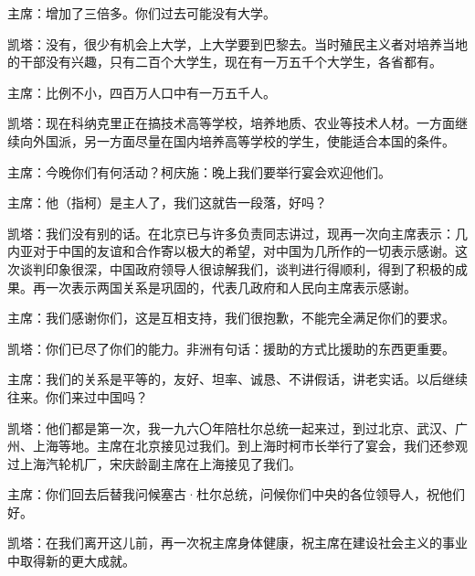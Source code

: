 主席：增加了三倍多。你们过去可能没有大学。

凯塔：没有，很少有机会上大学，上大学要到巴黎去。当时殖民主义者对培养当地的干部没有兴趣，只有二百个大学生，现在有一万五千个大学生，各省都有。

主席：比例不小，四百万人口中有一万五千人。

凯塔：现在科纳克里正在搞技术高等学校，培养地质、农业等技术人材。一方面继续向外国派，另一方面尽量在国内培养高等学校的学生，使能适合本国的条件。

主席：今晚你们有何活动？柯庆施：晚上我们要举行宴会欢迎他们。

主席：他（指柯）是主人了，我们这就告一段落，好吗？

凯塔：我们没有别的话。在北京已与许多负责同志讲过，现再一次向主席表示：几内亚对于中国的友谊和合作寄以极大的希望，对中国为几所作的一切表示感谢。这次谈判印象很深，中国政府领导人很谅解我们，谈判进行得顺利，得到了积极的成果。再一次表示两国关系是巩固的，代表几政府和人民向主席表示感谢。

主席：我们感谢你们，这是互相支持，我们很抱歉，不能完全满足你们的要求。

凯塔：你们已尽了你们的能力。非洲有句话：援助的方式比援助的东西更重要。

主席：我们的关系是平等的，友好、坦率、诚恳、不讲假话，讲老实话。以后继续往来。你们来过中国吗？

凯塔：他们都是第一次，我一九六〇年陪杜尔总统一起来过，到过北京、武汉、广州、上海等地。主席在北京接见过我们。到上海时柯市长举行了宴会，我们还参观过上海汽轮机厂，宋庆龄副主席在上海接见了我们。

主席：你们回去后替我问候塞古·杜尔总统，问候你们中央的各位领导人，祝他们好。

凯塔：在我们离开这儿前，再一次祝主席身体健康，祝主席在建设社会主义的事业中取得新的更大成就。
